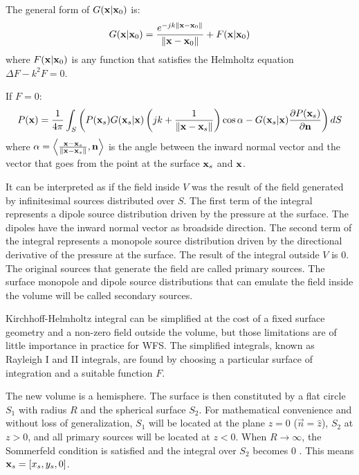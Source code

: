 The general form of $G(\PosTheo \vert \PosTheo_0)$ is:
\begin{equation}
G(\PosTheo \vert \PosTheo_0) = \GreenFunc[\PosTheo - \PosTheo_0] + F(\PosTheo \vert \PosTheo_0)
\label{GreensFunction}
\end{equation}
where $F(\PosTheo \vert \PosTheo_0)$ is any function that satisfies the Helmholtz equation $\Delta F - k^2 F = 0$.

If $F = 0$:
\begin{equation}
P(\PosTheo) = \frac{1}{4\pi} \int_{S} \left(P(\PosTheo[surface]) G(\PosTheo[surface] \vert \PosTheo)\left(jk + \frac{1}{\norm{\PosTheo - \PosTheo[surface]}}\right)\cos\alpha - G(\PosTheo[surface] \vert \PosTheo) \frac{\partial P(\PosTheo[surface])}{\partial \mathbf{n}} \right) dS
\end{equation}
where $\alpha = \left\langle \frac{\PosTheo - \PosTheo[surface]}{\norm{\PosTheo - \PosTheo[surface]}} , \vec{n} \right\rangle$ is the angle between the inward normal vector and the vector that goes from the point at the surface $\PosTheo[surface]$ and $\PosTheo$.

It can be interpreted as if the field inside $V$ was the result of the field generated by infinitesimal sources distributed over $S$. The first term of the integral represents a dipole source distribution driven by the pressure at the surface. The dipoles have the inward normal vector as broadside direction. The second term of the integral represents a monopole source distribution driven by the directional derivative of the pressure at the surface. The result of the integral outside $V$ is $0$. The original sources that generate the field are called primary sources. The surface monopole and dipole source distributions that can emulate the field inside the volume will be called secondary sources.

Kirchhoff-Helmholtz integral can be simplified at the cost of a fixed surface geometry and a non-zero field outside the volume, but those limitations are of little importance in practice for WFS. The simplified integrals, known as Rayleigh I and II integrals, are found by choosing a particular surface of integration and a suitable function $F$.

The new volume is a hemisphere. The surface is then constituted by a flat circle $S_1$ with radius $R$ and the spherical surface $S_2$. For mathematical convenience and without loss of generalization, $S_1$ will be located at the plane $z=0$ ($\vec{n} = \hat{z}$), $S_2$ at $z>0$, and all primary sources will be located at $z<0$. When $R\rightarrow\infty$, the Sommerfeld condition is satisfied and the integral over $S_2$ becomes $0$ \cite{Verheijen}. This means $\PosTheo[surface] = [x_s, y_s, 0]$.

